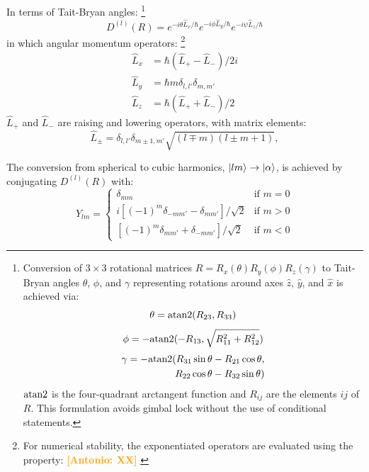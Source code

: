 \documentclass[twocolumn,showpacs,preprintnumbers,superscriptaddress,prb,floatfix,aps,10pt]{revtex4-1}
\newcommand{\abmei}[1]{\textcolor{orange}{ \bf [Antonio: #1] }}
\newcommand*{\wignerDl}{D^{(l)}(R)}
\newcommand*{\x}{\times}
\begin{document}
In terms of Tait-Bryan angles:
%
\footnote{
Conversion of $3\x3$ rotational matrices $R = R_x(\theta)R_y(\phi)R_z(\gamma)$ to Tait-Bryan angles $\theta$, $\phi$, and $\gamma$ representing rotations around axes $\hat{z}$, $\hat{y}$, and $\hat{x}$ is achieved via:
\begin{equation}
\theta = {\rm atan2}(R_{23},R_{33})
\end{equation}
\begin{equation}
\phi   =-{\rm atan2}(-R_{13},\sqrt{R_{11}^2+R_{12}^2})
\end{equation}
\begin{equation}
\begin{split}
\gamma =-{\rm atan2}(R_{31}\sin{\theta}-R_{21}\cos{\theta}, \\ 
       \quad         R_{22}\cos{\theta}-R_{32}\sin{\theta})
\end{split}
\end{equation}
${\rm atan2}$ is the four-quadrant arctangent function and $R_{ij}$ are the elements $ij$ of $R$. This formulation avoids gimbal lock without the use of conditional statements.} 
%
\begin{equation}
\wignerDl = e^{-i\theta\hat{L}_x/\hbar} e^{-i\phi\hat{L}_y/\hbar} e^{-i\psi\hat{L}_z/\hbar}
\end{equation}
%
in which angular momentum operators:
%
\footnote{For numerical stability, the exponentiated operators are evaluated using the property: \abmei{XX} } \cite{shankar_fundamentals_2014}
%
\begin{align}
\label{eq:angular_momenta}
\hat{L}_x & = \hbar (\hat{L}_{+}-\hat{L}_{-})/2i \\
\hat{L}_y & = \hbar m \delta_{l,l'}\delta_{m,m'} \\
\hat{L}_z & = \hbar (\hat{L}_{+}+\hat{L}_{-})/2
\end{align}
$\hat{L}_+$ and $\hat{L}_-$ are raising and lowering operators, with matrix elements:
\begin{equation}
\label{eq:raising_lowering_operator}
\hat{L}_{\pm} = \delta_{l,l'}\delta_{m\pm1,m'} \sqrt{(l\mp m)(l\pm m+1)},
\end{equation}



The conversion from spherical to cubic harmonics, $\ket{lm} \rightarrow \ket{\alpha}$, is achieved by conjugating $\wignerDl$ with:
\begin{equation}
\label{eq:cubic_harmonics}
Y_{lm} = 
\begin{cases}
\delta_{mm}                                      & \text{if } m = 0 \\
 i[(-1)^{m}\delta_{-mm'}-\delta_{ mm'}]/\sqrt{2} & \text{if } m > 0 \\
  [(-1)^{m}\delta_{ mm'}+\delta_{-mm'}]/\sqrt{2} & \text{if } m < 0
\end{cases}
\end{equation}
\end{document}
